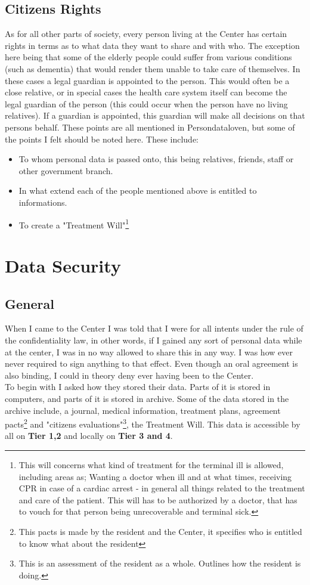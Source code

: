 \documentclass[11pt]{article}
\begin{document}
\subsection{Citizens Rights}
As for all other parts of society, every person living at the Center has certain rights in terms as to what data they want to share and with who. The exception here being that some of the elderly people could suffer from various conditions (such as dementia) that would render them unable to take care of themselves. In these cases a legal guardian is appointed to the person. This would often be a close relative, or in special cases the health care system itself can become the legal guardian of the person (this could occur when the person have no living relatives). If a guardian is appointed, this guardian will make all decisions on that persons behalf. These points are all mentioned in Persondataloven, but some of the points I felt should be noted here.
These include:
\begin{itemize}
\item To whom personal data is passed onto, this being relatives, friends, staff or other government branch.
\item In what extend each of the people mentioned above is entitled to informations.
\item To create a "Treatment Will"\footnote{This will concerns what kind of treatment for the terminal ill is allowed, including areas as; Wanting a doctor when ill and at what times, receiving CPR in case of a 
cardiac arrest - in general all things related to the treatment and care of the patient. This will has to be authorized by a doctor, that has to vouch for that person being unrecoverable and terminal sick.}
\end{itemize}
\section{Data Security}
\subsection{General}
When I came to the Center I was told that I were for all intents under the rule of the confidentiality law, in other words, if I gained any sort of personal data while at the center, I was in no way allowed to share this in any way. I was how ever never required to sign anything to that effect. Even though an oral agreement is also binding, I could in theory deny ever having been to the Center.\\
To begin with I asked how they stored their data. Parts of it is stored in computers, and parts of it is stored in archive. Some of the data stored in the archive include, a journal, medical information, treatment plans, agreement pacts\footnote{This pacts is made by the resident and the Center, it specifies who is entitled to know what about the resident} and "citizens evaluations"\footnote{This is an assessment of the resident as a whole. Outlines how the resident is doing.}, the Treatment Will. This data is accessible by all on \textbf{Tier 1,2} and locally on \textbf{Tier 3 and 4}.
\end{document}
